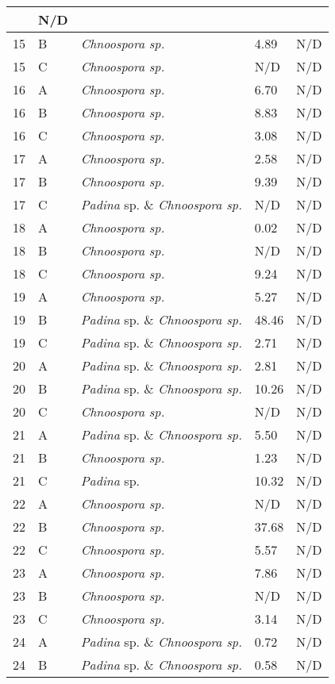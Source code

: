 \documentclass[12pt]{article}
\begin{document}
\begin{longtable}{ | p{1cm} | p{1cm} | p{3cm} | p{4cm} | p{4cm} | }
&N/D\\
\hline
15&B&\emph{Chnoospora sp.}&4.89
&N/D\\
\hline
15&C&\emph{Chnoospora sp.}&N/D&N/D\\
\hline
16&A&\emph{Chnoospora sp.}&6.70&N/D\\
\hline
16&B&\emph{Chnoospora sp.}&8.83
&N/D\\
\hline
16&C&\emph{Chnoospora sp.}&3.08
&N/D\\
\hline
17&A&\emph{Chnoospora sp.}&2.58
&N/D\\
\hline
17&B&\emph{Chnoospora sp.}&9.39
&N/D\\
\hline
17&C&\emph{Padina} sp. \& \emph{Chnoospora sp.}&N/D&N/D\\
\hline
18&A&\emph{Chnoospora sp.}&0.02
&N/D\\
\hline
18&B&\emph{Chnoospora sp.}&N/D&N/D\\
\hline
18&C&\emph{Chnoospora sp.}&9.24
&N/D\\
\hline
19&A&\emph{Chnoospora sp.}&5.27
&N/D\\
\hline
19&B&\emph{Padina} sp. \& \emph{Chnoospora sp.}&48.46
&N/D\\
\hline
19&C&\emph{Padina} sp. \& \emph{Chnoospora sp.}&2.71
&N/D\\
\hline
20&A&\emph{Padina} sp. \& \emph{Chnoospora sp.}&2.81
&N/D\\
\hline
20&B&\emph{Padina} sp. \& \emph{Chnoospora sp.}&10.26
&N/D\\
\hline
20&C&\emph{Chnoospora sp.}&N/D&N/D\\
\hline
21&A&\emph{Padina} sp. \& \emph{Chnoospora sp.}&5.50
&N/D\\
\hline
21&B&\emph{Chnoospora sp.}&1.23
&N/D\\
\hline
21&C&\emph{Padina} sp.&10.32
&N/D\\
\hline
22&A&\emph{Chnoospora sp.}&N/D&N/D\\
\hline
22&B&\emph{Chnoospora sp.}&37.68
&N/D\\
\hline
22&C&\emph{Chnoospora sp.}&5.57
&N/D\\
\hline
23&A&\emph{Chnoospora sp.}&7.86
&N/D\\
\hline
23&B&\emph{Chnoospora sp.}&N/D&N/D\\
\hline
23&C&\emph{Chnoospora sp.}&3.14
&N/D\\
\hline
24&A&\emph{Padina} sp. \& \emph{Chnoospora sp.}&0.72
&N/D\\
\hline
24&B&\emph{Padina} sp. \& \emph{Chnoospora sp.}&0.58
&N/D\\

\end{longtable}
\end{document}
